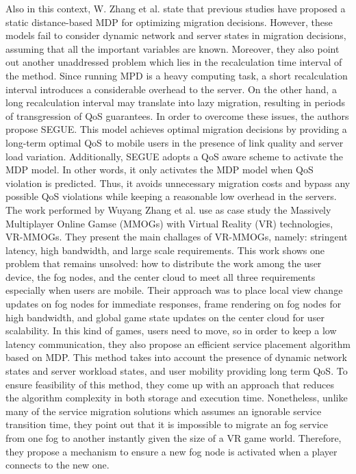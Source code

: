 \noindent\tab Also in this context, W. Zhang et al. \cite{zhang2016segue} state that previous studies have proposed a static distance-based MDP for optimizing migration decisions. However, these models fail to consider dynamic network and server states in migration decisions, assuming that all the important variables are known. Moreover, they also point out another unaddressed problem which lies in the recalculation time interval of the method. Since running MPD is a heavy computing task, a short recalculation interval introduces a considerable overhead to the server. On the other hand, a long recalculation interval may translate into lazy migration, resulting in periods of transgression of QoS guarantees. In order to overcome these issues, the authors propose SEGUE. This model achieves optimal migration decisions by providing a long-term optimal QoS to mobile users in the presence of link quality and server load variation. Additionally, SEGUE adopts a QoS aware scheme to activate the MDP model. In other words, it only activates the MDP model when QoS violation is predicted. Thus, it avoids unnecessary migration costs and bypass any possible QoS violations while keeping a reasonable low overhead in the servers. \\
\noindent\tab The work performed by Wuyang Zhang et al. \cite{zhang2017towards} use as case study the Massively Multiplayer Online Gamse (MMOGs) with Virtual Reality (VR) technologies, VR-MMOGs. They present the main challages of VR-MMOGs, namely: stringent latency, high bandwidth, and large scale requirements. This work shows one problem that remains unsolved: how to distribute the work among the user device, the fog nodes, and the center cloud to meet all three requirements especially when users are mobile. Their approach was to place local view change updates on fog nodes for immediate responses, frame rendering on fog nodes for high bandwidth, and global game state updates on the center cloud for user scalability. In this kind of games, users need to move, so in order to keep a low latency communication, they also propose an efficient service placement algorithm based on MDP. This method takes into account the presence of dynamic network states and server workload states, and user mobility providing long term QoS. To ensure feasibility of this method, they come up with an approach that reduces the algorithm complexity in both storage and execution time. Nonetheless, unlike many of the service migration solutions which assumes an ignorable service transition time, they point out that it is impossible to migrate an fog service from one fog to another instantly given the size of a VR game world. Therefore, they propose a mechanism to ensure a new fog node is activated when a player connects to the new one. \\[6pt]
